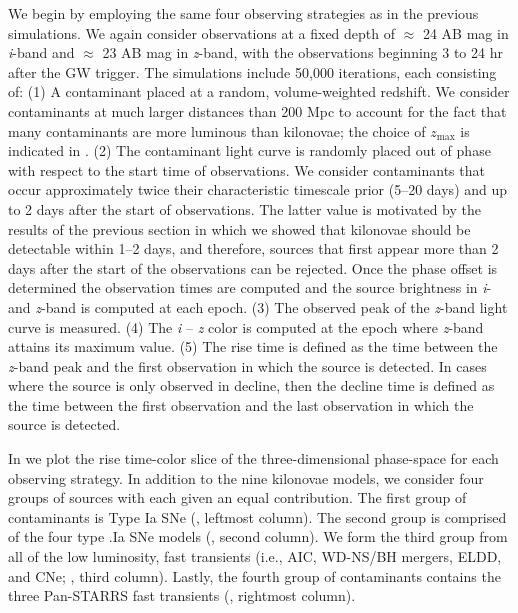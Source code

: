 We begin by employing the same four observing strategies as in the previous simulations. We again consider observations at a fixed depth of $\approx$ 24 AB mag in {\em i}-band and $\approx$ 23 AB mag in {\em z}-band, with the observations beginning 3 to 24 hr after the GW trigger. The simulations include 50,000 iterations, each consisting of: (1) A contaminant placed at a random, volume-weighted redshift. We consider contaminants at much larger distances than 200 Mpc to account for the fact that many contaminants are more luminous than kilonovae; the choice of $z_{\text{max}}$ is indicated in . (2) The contaminant light curve is randomly placed out of phase with respect to the start time of observations. We consider contaminants that occur approximately twice their characteristic timescale prior (5--20 days) and up to 2 days after the start of observations. The latter value is motivated by the results of the previous section in which we showed that kilonovae should be detectable within 1--2 days, and therefore, sources that first appear more than 2 days after the start of the observations can be rejected. Once the phase offset is determined the observation times are computed and the source brightness in {\em i}- and {\em z}-band is computed at each epoch. (3) The observed peak of the {\em z}-band light curve is measured. (4) The {\em i} -- {\em z} color is computed at the epoch where {\em z}-band attains its maximum value. (5) The rise time is defined as the time between the {\em z}-band peak and the first observation in which the source is detected. In cases where the source is only observed in decline, then the decline time is defined as the time between the first observation and the last observation in which the source is detected. 

In  we plot the rise time-color slice of the three-dimensional phase-space for each observing strategy. In addition to the nine kilonovae models, we consider four groups of sources with each given an equal contribution. The first group of contaminants is Type Ia SNe (, leftmost column). The second group is comprised of the four type .Ia SNe models (, second column). We form the third group from all of the low luminosity, fast transients (i.e., AIC, WD-NS/BH mergers, ELDD, and CNe; , third column). Lastly, the fourth group of contaminants contains the three Pan-STARRS fast transients (, rightmost column).

